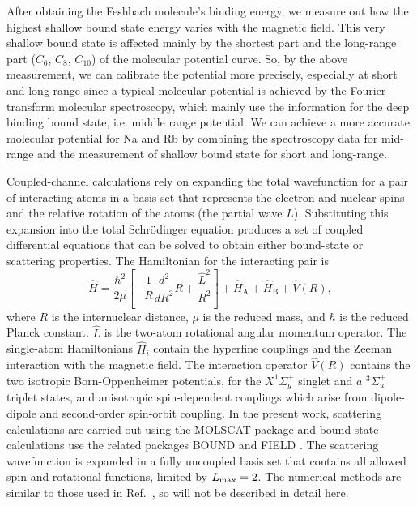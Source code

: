 After obtaining the Feshbach molecule's binding energy, we measure out how the highest shallow bound state energy varies with the magnetic field. This very shallow bound state is affected mainly by the shortest part and the long-range part ($C_6$, $C_8$, $C_{10}$) of the molecular potential curve. So, by the above measurement, we can calibrate the potential more precisely, especially at short and long-range since a typical molecular potential is achieved by the Fourier-transform molecular spectroscopy\cite{Pashov2005}, which mainly use the information for the deep binding bound state, i.e. middle range potential. We can achieve a more accurate molecular potential for Na and Rb by combining the spectroscopy data for mid-range and the measurement of shallow bound state for short and long-range. 

Coupled-channel calculations rely on expanding the total wavefunction for a pair of interacting atoms in a basis set that represents the electron and nuclear spins and the relative rotation of the atoms (the partial wave $L$). Substituting this expansion into the total Schr\"odinger equation produces a set of coupled differential equations that can be solved to obtain either bound-state or scattering properties. The Hamiltonian for the interacting pair is
\begin{equation}
\label{full_H}
\hat{H} =\frac{\hbar^2}{2\mu}\left[-\frac{1}{R}\frac{d^2}{dR^2}R
+\frac{\hat{L}^2}{R^2}\right]+\hat{H}_\textrm{A}+\hat{H}_\textrm{B}+\hat{V}(R),
\end{equation}
where $R$ is the internuclear distance, $\mu$ is the reduced mass, and $\hbar$ is the reduced Planck constant. $\hat{L}$ is the two-atom rotational angular momentum operator. The single-atom Hamiltonians $\hat{H}_i$ contain the hyperfine couplings and the Zeeman interaction with the magnetic field. The interaction operator $\hat{V}(R)$ contains the two isotropic Born-Oppenheimer potentials, for the $X^1\Sigma_g^+$ singlet and $a$ $^3\Sigma_u^+$ triplet states, and anisotropic spin-dependent couplings which arise from dipole-dipole and second-order spin-orbit coupling. In the present work, scattering calculations are carried out using the MOLSCAT package
\cite{molscat:2019,mbf-github:2020} and bound-state calculations use the related packages BOUND and FIELD \cite{mbf-github:2020}. The scattering wavefunction is expanded in a fully uncoupled basis set that contains all allowed spin and rotational functions, limited by $L_{\rm max}=2$. The numerical methods are similar to those used in Ref.\ \cite{Berninger:Cs2:2013}, so will not be described in detail here.

